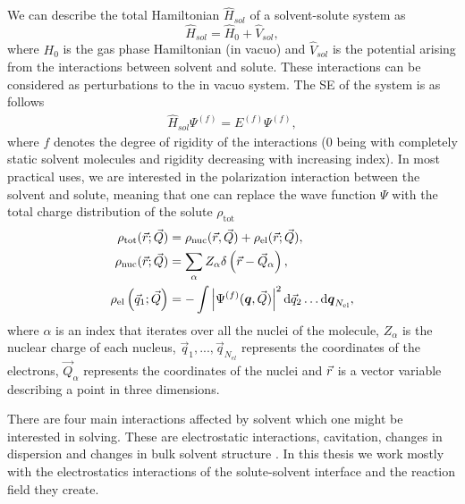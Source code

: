 \documentclass[../Thesis.tex]{subfiles}
\begin{document}
We can describe the total Hamiltonian $\hat{H}_{sol}$ of a solvent-solute system as
\cite{Tomasi:1994wt}
\begin{equation}\label{eq:Hsolvent}
  \hat{H}_{sol} = \hat{H}_0 + \hat{V}_{sol},
\end{equation}
where $H_0$ is the gas phase Hamiltonian (in vacuo) and $\hat{V}_{sol}$ is the
potential arising from the interactions between solvent and solute. These
interactions can be considered as perturbations to the in vacuo system.
The \ac{SE} of the system is as follows \cite{Tomasi:1994wt}
\begin{align}\label{eq:solSE}
  \hat{H}_{sol}\Psi^{(f)} = E^{(f)}\Psi^{(f)},
\end{align}
where $f$ denotes the degree of  rigidity of the interactions (0 being with
completely static solvent molecules and rigidity decreasing with increasing
index). In most practical uses, we are interested in the polarization interaction
between the solvent and solute, meaning that one can replace the wave function $\Psi$ with the
total charge distribution of the solute $\rho_{\mathrm{tot}}$
\cite{Tomasi:1994wt}
\begin{align}
  \begin{split}\mathbb{}
      \rho_{\mathrm{tot}}(\vec{r} ; \vec{Q}) &=
      \rho_{\mathrm{nuc}}(\vec{r}, \vec{Q})
      + \rho_{\mathrm{el}}(\vec{r} ; \vec{Q}), \\
      \rho_{\mathrm{nuc}}(\vec{r} ; \vec{Q}) &=
      \sum_{\alpha} Z_{\alpha} \delta\left(\vec{r}
      - \vec{Q}_{\alpha}\right), \\
      \rho_{\mathrm{el}}\left(\vec{q}_{1} ; \vec{Q}\right) &=
      -\int\left|\Psi^{(f)}(\boldsymbol{q}, \vec{Q})\right|^{2}
      \mathrm{d}\vec{q}_{2} \ldots \mathrm{d}\boldsymbol{q}_{N_{\mathrm{el}}},
  \end{split}
\end{align}
where $\alpha$ is an index that iterates over all the nuclei of the molecule,
$Z_{\alpha}$ is the nuclear charge of each nucleus, $\vec{q}_1, ..., \vec{q}_{N_{el}}$
represents the coordinates of the electrons, $\vec{Q}_{\alpha}$ represents the
coordinates of the nuclei and $\vec{r}$ is a vector variable describing a point
in three dimensions.

There are four main interactions affected by solvent which one might be
interested in solving. These are electrostatic interactions, cavitation,
changes in dispersion and changes in bulk solvent structure \cite{Cramer:2004}.
In this thesis we work mostly with the electrostatics interactions of the
solute-solvent interface and the reaction field they create.
\end{document}
